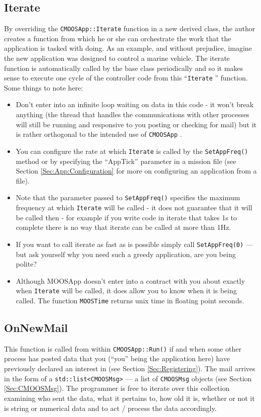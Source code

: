 \documentclass[a4paper,10pt]{article}
\newcommand{\Code}[1]{\texttt{#1} }
\newcommand{\code}[1]{\Code{#1} }
\begin{document}
\subsection{Iterate}\label{Sec:Iterate}
By overriding the \code{CMOOSApp::Iterate} function in a new
derived class, the author creates a function from which he or she
can orchestrate the work that the application is tasked with
doing. As an example, and without prejudice, imagine the new
application was designed to control a marine vehicle. The iterate
function is automatically called by the base class periodically
and so it makes sense to execute one cycle of the controller code
from this ``\code{Iterate}'' function. Some things to note here:
\begin{itemize}
\item Don't enter into an infinite loop waiting on data in this code - it won't break anything (the thread that handles the communications with other processes will still be running and responsive to you posting or checking for mail) but it is rather orthogonal to the intended use of \code{CMOOSApp}.
\item You can configure the rate at which \code{Iterate} is called by the \code{SetAppFreq()} method or by specifying the ``AppTick'' parameter in a mission file (see Section \ref{Sec:App:Configuration} for more on configuring an application from a file).
\item Note that the parameter passed to \code{SetAppFreq()} specifies the maximum frequency at which \code{Iterate} will be called - it does not guarantee that it will be called then - for example if you write code in iterate that takes 1s to complete there is no way that iterate can be called at more than 1Hz.
\item If you want to call iterate as fast as is possible simply call  \code{SetAppFreq(0)} --- but ask yourself why you need such a greedy application, are you being polite?
\item Although MOOSApp doesn't enter into a contract with you about exactly when \code{Iterate} will be called, it does allow you to know when it is being called. The function \code{MOOSTime} returns unix time in floating point seconds.
\end{itemize}


\subsection{OnNewMail}\label{Sec:OnNewMail}

This function is called from within \code{CMOOSApp::Run()} if and
when some other process has posted data that you (``you'' being
the application here) have previously declared an interest in (see
Section \ref{Sec:Registering}). The mail arrives in the form
of a \code{std::list<CMOOSMsg>} --- a list of \code{CMOOSMsg}
objects (see Section \ref{Sec:CMOOSMsg}). The programmer is free to
iterate over this collection examining who sent the data, what it
pertains to, how old it is, whether or not it is string or
numerical data and to act / process the data accordingly.
\end{document}
